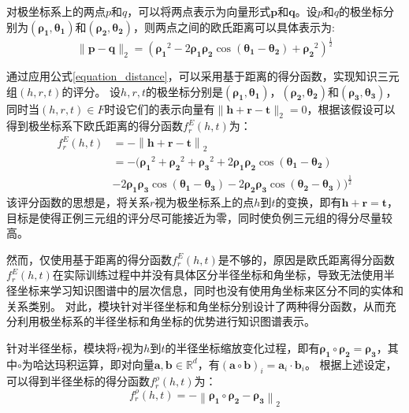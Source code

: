 \documentclass[algorithmlist, AutoFakeBold, AutoFakeSlant, figurelist, tablelist, nomlist, engineering, openany]{seuthesix} %
\begin{document}
对极坐标系上的两点$p$和$q$，可以将两点表示为向量形式$\bm{p}$和$\bm{q}$。设$p$和$q$的极坐标分别为$(\bm{\rho_1}, \bm{\theta_1})$和$(\bm{\rho_2}, \bm{\theta_2})$，则两点之间的欧氏距离可以具体表示为:
\begin{equation}
  \|\bm{p}-\bm{q}\|_2=\left(\bm{\rho_1}^2-2 \bm{\rho_1} \bm{\rho_2} \cos \left(\bm{\theta_1}-\bm{\theta_2}\right)+\bm{\rho_2}^2\right)^{\frac{1}{2}}
  \label{equation_distance}
\end{equation}

通过应用公式\ref{equation_distance}，可以采用基于距离的得分函数，实现知识三元组$(h, r, t)$的评分。
设$h, r, t$的极坐标分别是$\left(\bm{\rho_1}, \bm{\theta_1}\right)$，$\left(\bm{\rho_2}, \bm{\theta_2}\right)$和$\left(\bm{\rho_3}, \bm{\theta_3}\right)$，同时当$(h, r, t) \in F$时设它们的表示向量有$\|\bm{h} + \bm{r} - \bm{t}\|_2 = 0$，根据该假设可以得到极坐标系下欧氏距离的得分函数$f^E_r(h, t)$为：
\begin{equation}
  \begin{aligned}
    f^{E}_{r}\left(h, t\right) & =-\left\|\bm{h}+\bm{r}-\bm{t}\right\|_2 \\
    & =-(\bm{\rho_1}^2+\bm{\rho_2}^2+\bm{\rho_3}^2 + 2 \bm{\rho_1} \bm{\rho_2} \cos \left(\bm{\theta_1}-\bm{\theta_2}\right) \\
    & - 2 \bm{\rho_1} \bm{\rho_3} \cos \left(\bm{\theta_1}-\bm{\theta_3}\right) - 2 \bm{\rho_2} \bm{\rho_3} \cos \left(\bm{\theta_2}-\bm{\theta_3}\right))^{\frac{1}{2}}
  \end{aligned}
\end{equation}
该评分函数的思想是，将关系$r$视为极坐标系上的点$h$到$t$的变换，即有$\bm{h} + \bm{r} = \bm{t}$，目标是使得正例三元组的评分尽可能接近为零，同时使负例三元组的得分尽量较高。

然而，仅使用基于距离的得分函数$f^E_r(h, t)$是不够的，原因是欧氏距离得分函数$f^E_r(h, t)$在实际训练过程中并没有具体区分半径坐标和角坐标，导致无法使用半径坐标来学习知识图谱中的层次信息，同时也没有使用角坐标来区分不同的实体和关系类别。
对此，模块针对半径坐标和角坐标分别设计了两种得分函数，从而充分利用极坐标系的半径坐标和角坐标的优势进行知识图谱表示。

针对半径坐标，模块将$r$视为$h$到$t$的半径坐标缩放变化过程，即有$\bm{\rho_1} \circ \bm{\rho_2} = \bm{\rho_3}$，其中$\circ$为哈达玛积运算，即对向量$\bm{a}, \bm{b} \in \mathbb{R}^{d}$，有$\left(\mathbf{a} \circ \mathbf{b}\right)_i = \mathbf{a}_i \cdot \mathbf{b}_i$。
根据上述设定，可以得到半径坐标的得分函数$f^{\rho}_r(h, t)$为：
\begin{equation}
  f^{\rho}_r\left(h, t\right) =-\left\|\bm{\rho_1} \circ \bm{\rho_2} - \bm{\rho_3}\right\|_2
\end{equation}
\end{document}
